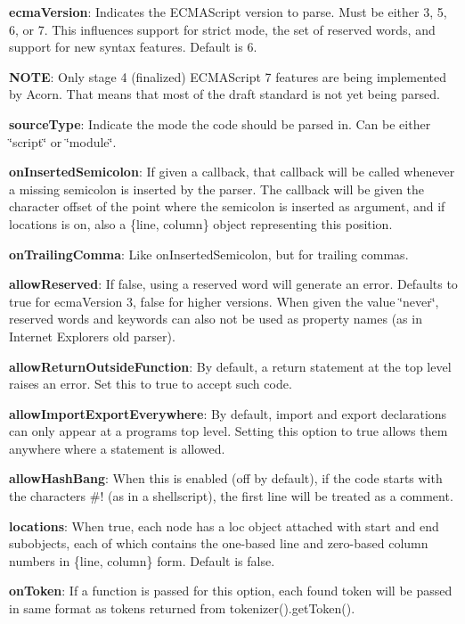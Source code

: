\begin{DoxyItemize}
\item {\bfseries ecma\+Version}\+: Indicates the E\+C\+M\+A\+Script version to parse. Must be either 3, 5, 6, or 7. This influences support for strict mode, the set of reserved words, and support for new syntax features. Default is 6.

{\bfseries N\+O\+TE}\+: Only \textquotesingle{}stage 4\textquotesingle{} (finalized) E\+C\+M\+A\+Script 7 features are being implemented by Acorn. That means that most of the draft standard is not yet being parsed.
\item {\bfseries source\+Type}\+: Indicate the mode the code should be parsed in. Can be either {\ttfamily \char`\"{}script\char`\"{}} or {\ttfamily \char`\"{}module\char`\"{}}.
\item {\bfseries on\+Inserted\+Semicolon}\+: If given a callback, that callback will be called whenever a missing semicolon is inserted by the parser. The callback will be given the character offset of the point where the semicolon is inserted as argument, and if {\ttfamily locations} is on, also a {\ttfamily \{line, column\}} object representing this position.
\item {\bfseries on\+Trailing\+Comma}\+: Like {\ttfamily on\+Inserted\+Semicolon}, but for trailing commas.
\item {\bfseries allow\+Reserved}\+: If {\ttfamily false}, using a reserved word will generate an error. Defaults to {\ttfamily true} for {\ttfamily ecma\+Version} 3, {\ttfamily false} for higher versions. When given the value {\ttfamily \char`\"{}never\char`\"{}}, reserved words and keywords can also not be used as property names (as in Internet Explorer\textquotesingle{}s old parser).
\item {\bfseries allow\+Return\+Outside\+Function}\+: By default, a return statement at the top level raises an error. Set this to {\ttfamily true} to accept such code.
\item {\bfseries allow\+Import\+Export\+Everywhere}\+: By default, {\ttfamily import} and {\ttfamily export} declarations can only appear at a program\textquotesingle{}s top level. Setting this option to {\ttfamily true} allows them anywhere where a statement is allowed.
\item {\bfseries allow\+Hash\+Bang}\+: When this is enabled (off by default), if the code starts with the characters {\ttfamily \#!} (as in a shellscript), the first line will be treated as a comment.
\item {\bfseries locations}\+: When {\ttfamily true}, each node has a {\ttfamily loc} object attached with {\ttfamily start} and {\ttfamily end} subobjects, each of which contains the one-\/based line and zero-\/based column numbers in {\ttfamily \{line, column\}} form. Default is {\ttfamily false}.
\item {\bfseries on\+Token}\+: If a function is passed for this option, each found token will be passed in same format as tokens returned from {\ttfamily tokenizer().get\+Token()}.


\end{DoxyItemize}
